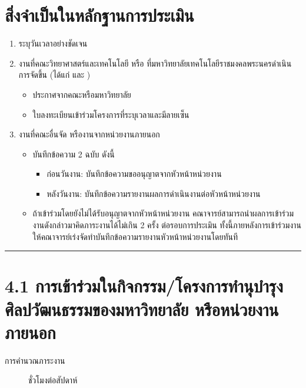 \documentclass[a4paper,12pt,english]{sphinxmanual}
\begin{document}
\section{สิ่งจำเป็นในหลักฐานการประเมิน}
\label{\detokenize{4culture:id3}}\begin{enumerate}
%
\item {} 
 ระบุวันเวลาอย่างชัดเจน

\item {} 
งานที่คณะวิทยาศาสตร์และเทคโนโลยี หรือ ที่มหาวิทยาลัยเทคโนโลยีราชมงคลพระนครดำเนินการจัดขึ้น (ได้แก่ {\hyperref[\detokenize{4culture:id4}]{}} และ {\hyperref[\detokenize{4culture:id13}]{}})
\begin{itemize}
\item {} 
ประกาศจากคณะหรือมหาวิทยาลัย

\item {} 
ใบลงทะเบียนเข้าร่วมโครงการที่ระบุเวลาและมีลายเซ็น

\end{itemize}

\item {} 
งานที่คณะอื่นจัด หรืองานจากหน่วยงานภายนอก
\begin{itemize}
\item {} 
บันทึกข้อความ 2 ฉบับ ดังนี้
\begin{itemize}
\item {} 
ก่อนวันงาน: บันทึกข้อความขออนุญาตจากหัวหน้าหน่วยงาน

\item {} 
หลังวันงาน: บันทึกข้อความรายงานผลการดำเนินงานต่อหัวหน้าหน่วยงาน

\end{itemize}

\item {} 
ถ้าเข้าร่วมโดยยังไม่ได้รับอนุญาตจากหัวหน้าหน่วยงาน คณาจารย์สามารถนำผลการเข้าร่วมงานดังกล่าวมาคิดภาระงานได้ไม่เกิน 2 ครั้ง ต่อรอบการประเมิน ทั้งนี้ภายหลังการเข้าร่วมงานให้คณาจารย์เร่งจัดทำบันทึกข้อความรายงานหัวหน้าหน่วยงานโดยทันที

\end{itemize}

\end{enumerate}


\bigskip\hrule\bigskip



\section{4.1 การเข้าร่วมในกิจกรรม/โครงการทำนุบำรุงศิลปวัฒนธรรมของมหาวิทยาลัย หรือหน่วยงานภายนอก}
\label{\detokenize{4culture:id4}}\label{\detokenize{4culture:id5}}\begin{description}
\item[{การคำนวณภาระงาน}]  ชั่วโมงต่อสัปดาห์

\end{description}
\end{document}
